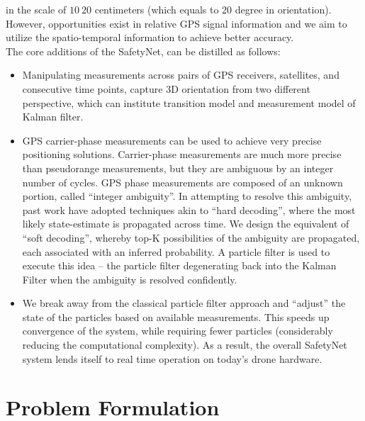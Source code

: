 \documentclass[journal,onecolumn]{IEEEtran}
\begin{document}
in the scale of $10~20$ centimeters (which equals to 20 degree in orientation).
However, opportunities exist in relative GPS signal information and we aim to utilize
the spatio-temporal information to achieve better accuracy.\\
The core additions of the SafetyNet, can be distilled as follows:
\begin{itemize}
  \item Manipulating measurements across pairs of GPS receivers, satellites, and
  consecutive time points, capture 3D orientation from two different perspective,
  which can institute transition model and measurement model of Kalman filter.
  \item GPS carrier-phase measurements can be used to achieve very precise positioning
  solutions. Carrier-phase measurements are much more precise than pseudorange
  measurements, but they are ambiguous by an integer number of cycles. GPS phase
  measurements are composed of an unknown portion, called “integer ambiguity”.
  In attempting to resolve this ambiguity, past work have adopted techniques akin
  to “hard decoding”, where the most likely state-estimate is propagated across
  time. We design the equivalent of “soft decoding”, whereby top-K possibilities
  of the ambiguity are propagated, each associated with an inferred probability.
  A particle filter is used to execute this idea – the particle filter degenerating
  back into the Kalman Filter when the ambiguity is resolved confidently.
  \item We break away from the classical particle filter approach and “adjust”
  the state of the particles based on available measurements. This speeds up
  convergence of the system, while requiring fewer particles (considerably
  reducing the computational complexity). As a result, the overall SafetyNet
  system lends itself to real time operation on today’s drone hardware.
\end{itemize}

\section{Problem Formulation}
\end{document}
